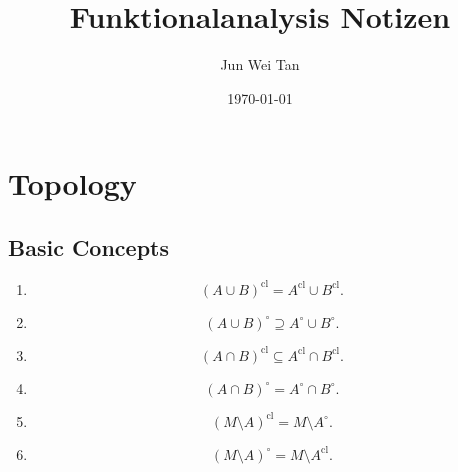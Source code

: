 \documentclass[prb,12pt]{revtex4-2}
\theoremstyle{definition}
\theoremstyle{definition}
\theoremstyle{definition}
\newenvironment{parts}{\begin{enumerate}[label=(\alph*)]}{\end{enumerate}}
\begin{document}
	\title{Funktionalanalysis Notizen}
	\author{Jun Wei Tan}
	\date{\today}
	\maketitle
	\tableofcontents
	\section{Topology}
	\subsection{Basic Concepts}
	\begin{Theorem}
		\noindent
		\begin{parts}
			\item
			\[(A\cup B)^\text{cl}=A^\text{cl}\cup B^\text{cl}.\]
			\item 
			\[
			(A\cup B)^{\circ}\supseteq A^\circ \cup B^\circ
			.\] 
			\item \[
			(A\cap B)^\text{cl}\subseteq A^\text{cl}\cap B^\text{cl}
			.\]
			\item 	\[
			(A\cap B)^\circ = A^\circ \cap B^\circ
			.\] 
			\item \[
			(M\setminus A)^\text{cl}=M\setminus A^{\circ}
			.\]
			\item \[
			(M\setminus A)^\circ = M \setminus A^\text{cl}
			.\] 
		\end{parts}
	\end{Theorem}
\end{document}
